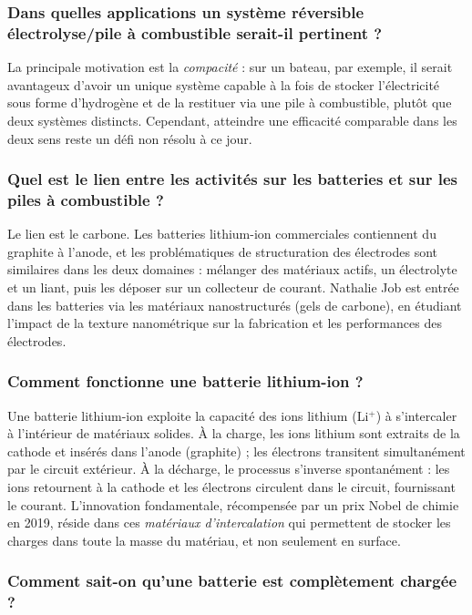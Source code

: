 \subsubsection{Dans quelles applications un système réversible électrolyse/pile à combustible serait-il pertinent ?}

La principale motivation est la \textit{compacité} : sur un bateau, par exemple, il serait avantageux d'avoir un unique système capable à la fois de stocker l'électricité sous forme d'hydrogène et de la restituer via une pile à combustible, plutôt que deux systèmes distincts. Cependant, atteindre une efficacité comparable dans les deux sens reste un défi non résolu à ce jour.

\subsubsection{Quel est le lien entre les activités sur les batteries et sur les piles à combustible ?}

Le lien est le carbone. Les batteries lithium-ion commerciales contiennent du graphite à l'anode, et les problématiques de structuration des électrodes sont similaires dans les deux domaines : mélanger des matériaux actifs, un électrolyte et un liant, puis les déposer sur un collecteur de courant. Nathalie Job est entrée dans les batteries via les matériaux nanostructurés (gels de carbone), en étudiant l'impact de la texture nanométrique sur la fabrication et les performances des électrodes.

\subsubsection{Comment fonctionne une batterie lithium-ion ?}

Une batterie lithium-ion exploite la capacité des ions lithium (Li$^+$) à s'intercaler à l'intérieur de matériaux solides. À la charge, les ions lithium sont extraits de la cathode et insérés dans l'anode (graphite) ; les électrons transitent simultanément par le circuit extérieur. À la décharge, le processus s'inverse spontanément : les ions retournent à la cathode et les électrons circulent dans le circuit, fournissant le courant. L'innovation fondamentale, récompensée par un prix Nobel de chimie en 2019, réside dans ces \textit{matériaux d'intercalation} qui permettent de stocker les charges dans toute la masse du matériau, et non seulement en surface.

\subsubsection{Comment sait-on qu'une batterie est complètement chargée ?}

